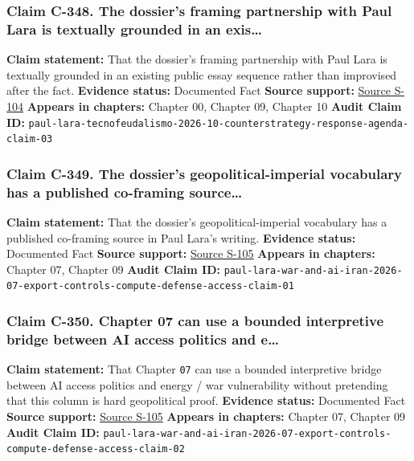 \documentclass[
  american,
  11pt,
  letterpaper,
]{article}
\begin{document}
\subsubsection{Claim C-348. The dossier's framing partnership with Paul
Lara is textually grounded in an
exis\ldots{}}\label{claim-c-348-the-dossier-s-framing-partnership-with-paul-lara-is-textually-grounded-in-an-exis}

\textbf{Claim statement:} That the dossier's framing partnership with
Paul Lara is textually grounded in an existing public essay sequence
rather than improvised after the fact. \textbf{Evidence status:}
Documented Fact \textbf{Source support:}
\hyperref[source-s-104-c-mo-hackear-al-tecnofeudalismo]{Source S-104}
\textbf{Appears in chapters:} Chapter 00, Chapter 09, Chapter 10
\textbf{Audit Claim ID:}
\texttt{paul-lara-tecnofeudalismo-2026-10-counterstrategy-response-agenda-claim-03}

\subsubsection{Claim C-349. The dossier's geopolitical-imperial
vocabulary has a published co-framing
source\ldots{}}\label{claim-c-349-the-dossier-s-geopolitical-imperial-vocabulary-has-a-published-co-framing-source}

\textbf{Claim statement:} That the dossier's geopolitical-imperial
vocabulary has a published co-framing source in Paul Lara's writing.
\textbf{Evidence status:} Documented Fact \textbf{Source support:}
\hyperref[source-s-105-guerra-e-ia-por-qu-le-urge-a-eu-terminar-con-ir-n]{Source
S-105} \textbf{Appears in chapters:} Chapter 07, Chapter 09
\textbf{Audit Claim ID:}
\texttt{paul-lara-war-and-ai-iran-2026-07-export-controls-compute-defense-access-claim-01}

\subsubsection{Claim C-350. Chapter 07 can use a bounded interpretive
bridge between AI access politics and
e\ldots{}}\label{claim-c-350-chapter-07-can-use-a-bounded-interpretive-bridge-between-ai-access-politics-and-e}

\textbf{Claim statement:} That Chapter \texttt{07} can use a bounded
interpretive bridge between AI access politics and energy / war
vulnerability without pretending that this column is hard geopolitical
proof. \textbf{Evidence status:} Documented Fact \textbf{Source
support:}
\hyperref[source-s-105-guerra-e-ia-por-qu-le-urge-a-eu-terminar-con-ir-n]{Source
S-105} \textbf{Appears in chapters:} Chapter 07, Chapter 09
\textbf{Audit Claim ID:}
\texttt{paul-lara-war-and-ai-iran-2026-07-export-controls-compute-defense-access-claim-02}
\end{document}
